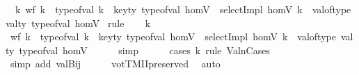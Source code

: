 \begin{isabellebody}
\ \ {\isachardoublequoteopen}{\isacharparenleft}{\kern0pt}{\isasymforall}k{\isachardot}{\kern0pt}\ {\isacharparenleft}{\kern0pt}{\isasymnot}wf\ k\ {\isasymor}\ type{\isacharunderscore}{\kern0pt}of{\isacharunderscore}{\kern0pt}val\ k\ {\isasymnoteq}\ key{\isacharunderscore}{\kern0pt}ty\ {\isacharparenleft}{\kern0pt}type{\isacharunderscore}{\kern0pt}of{\isacharunderscore}{\kern0pt}val\ homV{\isacharparenright}{\kern0pt}{\isacharparenright}{\kern0pt}\ {\isasymlongrightarrow}\ {\isacharparenleft}{\kern0pt}selectImpl\ homV\ k{\isacharparenright}{\kern0pt}\ {\isacharequal}{\kern0pt}\ val{\isacharunderscore}{\kern0pt}of{\isacharunderscore}{\kern0pt}type\ {\isacharparenleft}{\kern0pt}val{\isacharunderscore}{\kern0pt}ty\ {\isacharparenleft}{\kern0pt}type{\isacharunderscore}{\kern0pt}of{\isacharunderscore}{\kern0pt}val\ homV{\isacharparenright}{\kern0pt}{\isacharparenright}{\kern0pt}{\isacharparenright}{\kern0pt}{\isachardoublequoteclose}\isanewline
%
\isadelimproof
%
\endisadelimproof
%
\isatagproof
{}\isamarkupfalse%
\ rule\isanewline
\ \ \isamarkupfalse%
\ k\isanewline
\ \ \isamarkupfalse%
\ {\isachardoublequoteopen}{\isacharparenleft}{\kern0pt}{\isasymnot}wf\ k\ {\isasymor}\ type{\isacharunderscore}{\kern0pt}of{\isacharunderscore}{\kern0pt}val\ k\ {\isasymnoteq}\ key{\isacharunderscore}{\kern0pt}ty\ {\isacharparenleft}{\kern0pt}type{\isacharunderscore}{\kern0pt}of{\isacharunderscore}{\kern0pt}val\ homV{\isacharparenright}{\kern0pt}{\isacharparenright}{\kern0pt}\ {\isasymlongrightarrow}\ {\isacharparenleft}{\kern0pt}selectImpl\ homV\ k{\isacharparenright}{\kern0pt}\ {\isacharequal}{\kern0pt}\ val{\isacharunderscore}{\kern0pt}of{\isacharunderscore}{\kern0pt}type\ {\isacharparenleft}{\kern0pt}val{\isacharunderscore}{\kern0pt}ty\ {\isacharparenleft}{\kern0pt}type{\isacharunderscore}{\kern0pt}of{\isacharunderscore}{\kern0pt}val\ homV{\isacharparenright}{\kern0pt}{\isacharparenright}{\kern0pt}{\isachardoublequoteclose}\isanewline
\ \ \ \ \isamarkupfalse%
\ simp\isanewline
\ \ \ \ \isamarkupfalse%
\ {\isacharparenleft}{\kern0pt}cases\ k\ rule{\isacharcolon}{\kern0pt}\ ValnCases{\isacharparenright}{\kern0pt}\isanewline
\ \ \ \ \isamarkupfalse%
\ {\isacharparenleft}{\kern0pt}simp\ add{\isacharcolon}{\kern0pt}\ valBij{}{\isacharparenright}{\kern0pt}\isanewline
\ \ \ \ \isamarkupfalse%
\ votTMIIpreserved\ \isamarkupfalse%
\ auto{\isacharbrackleft}{\kern0pt}{}{\isacharbrackright}{\kern0pt}\isanewline

\end{isabellebody}
